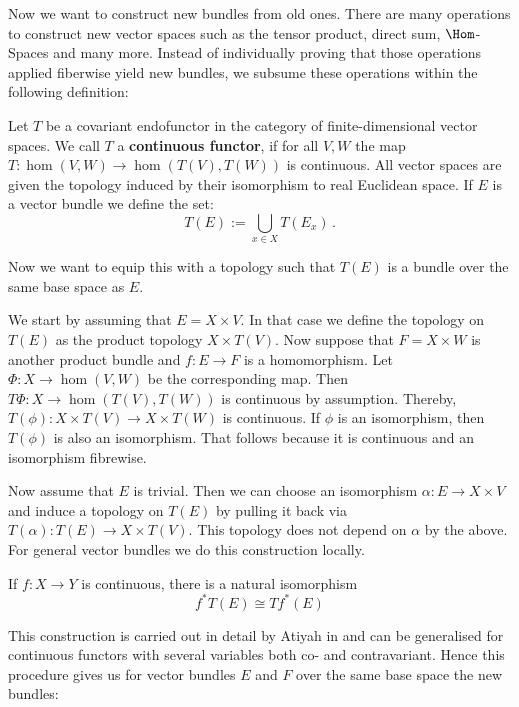 Now we want to construct new bundles from old ones. There are many operations to construct new vector spaces such as the tensor product, direct sum, $\Hom$-Spaces and many more. Instead of individually proving that those operations applied fiberwise yield new bundles, we subsume these operations within the following definition: 

\begin{definition}
	Let $T$ be a covariant endofunctor in the category of finite-dimensional vector spaces. We call $T$ a \textbf{continuous functor}, if for all $V,W$ the map $T:\hom(V,W)\to \hom(T(V),T(W))$ is continuous. All vector spaces are given the topology induced by their isomorphism to real Euclidean space. If $E$  is a vector bundle we define the set:
	\begin{equation*}
		T(E):=\bigcup_{x\in X}T(E_x)\,.
	\end{equation*} 
\end{definition}
Now we want to equip this with a topology such that $T(E)$ is a bundle over the same base space as $E$.
\begin{definition}\label{def:vb-constructingNewBundles}
	We start by assuming that $E = X\times V$. In that case we define the topology on $T(E)$ as the product topology $X\times T(V)$. Now suppose that $F = X \times W$ is another product bundle and $f:E\to F$ is a homomorphism. Let $\Phi: X \to \hom(V,W)$ be the corresponding map. Then $T\Phi: X\to \hom(T(V),T(W))$ is continuous by assumption. Thereby, $T(\phi):X\times T(V)\to X\times T(W)$ is continuous. If $\phi$ is an isomorphism, then $T(\phi)$ is also an isomorphism. That follows because it is continuous and an isomorphism fibrewise.
	
	Now assume that $E$ is trivial. Then we can choose an isomorphism $\alpha: E\to X\times V$ and induce a topology on $T(E)$ by pulling it back via $T(\alpha) : T(E) \to X\times T(V)$. This topology does not depend on $\alpha$ by the above. 
	For general vector bundles we do this construction locally. 
	
	If $f:X\to Y$ is continuous, there is a natural isomorphism
	\begin{equation*}
		f^*T(E)\cong Tf^*(E)
	\end{equation*}

\end{definition}
	This construction is carried out in detail by Atiyah in \cite[Chapter 1.2]{atiyah1989k} and can be generalised for continuous functors with several variables both co- and contravariant. Hence this procedure gives us for vector bundles $E$ and $F$ over the same base space the new bundles:
